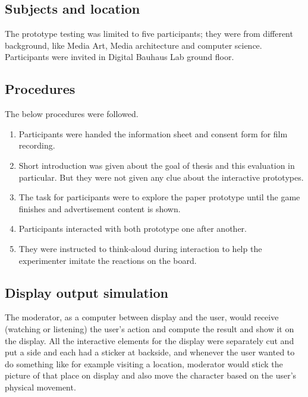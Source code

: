 \subsection{Subjects and location}
The prototype testing was limited to five participants; they were from different background, like Media Art, Media architecture and computer science. Participants were invited in Digital Bauhaus Lab ground floor.


\subsection{Procedures}

The below procedures were followed.

\begin{enumerate}
\item Participants were handed the information sheet and consent form for film recording.
\item Short introduction was given about the goal of thesis and this evaluation in particular. But they were not given any clue about the interactive prototypes.
\item The task for participants were to explore the paper prototype until the game finishes and advertisement content is shown.
\item Participants interacted with both prototype one after another.
\item They were instructed to think-aloud during interaction to help the experimenter imitate the reactions on the board.
\end{enumerate}


\subsection{Display output simulation}
The moderator, as a computer between display and the user, would receive (watching or listening) the user’s action and compute the result and show it on the display. All the interactive elements for the display were separately cut and put a side and each had a sticker at backside, and whenever the user wanted to do something like for example visiting a location, moderator would stick the picture of that place on display and also move the character based on the user’s physical movement.

